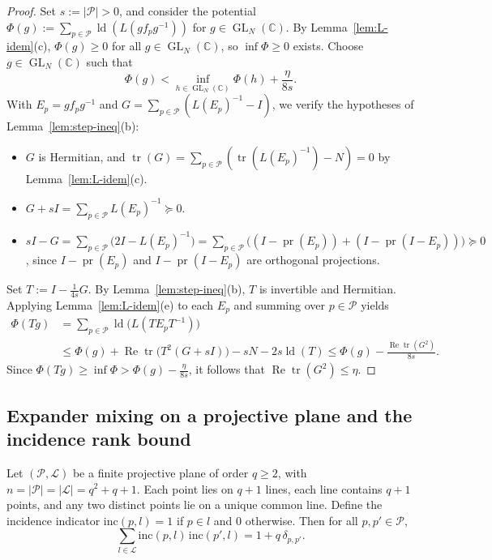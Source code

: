 \documentclass[11pt]{article}
\theoremstyle{definition}
\theoremstyle{remark}
\numberwithin{equation}{section}
\DeclareMathOperator{\tr}{tr}
\DeclareMathOperator{\ld}{ld}
\DeclareMathOperator{\pr}{pr}
\DeclareMathOperator{\GL}{GL}
\DeclareMathOperator{\RePart}{Re}
\newcommand{\C}{\mathbb{C}}
\newcommand{\PP}{\mathcal{P}}
\newcommand{\LL}{\mathcal{L}}
\newcommand{\1}{\mathbf{1}}
\begin{document}
\begin{proof}
Set $s := |\PP| > 0$, and consider the potential $\Phi(g) := \sum_{p \in \PP} \ld(L(g f_p g^{-1}))$ for $g \in \GL_N(\C)$. By Lemma~\ref{lem:L-idem}(c), $\Phi(g) \ge 0$ for all $g \in \GL_N(\C)$, so $\inf \Phi \ge 0$ exists. Choose $g \in \GL_N(\C)$ such that
\[
\Phi(g) < \inf_{h \in \GL_N(\C)} \Phi(h) + \frac{\eta}{8s}.
\]
With $E_p = g f_p g^{-1}$ and $G = \sum_{p \in \PP}(L(E_p)^{-1} - I)$, we verify the hypotheses of Lemma~\ref{lem:step-ineq}(b):
\begin{itemize}[leftmargin=1.8em]
\item $G$ is Hermitian, and $\tr(G) = \sum_{p \in \PP}(\tr(L(E_p)^{-1}) - N) = 0$ by Lemma~\ref{lem:L-idem}(c).
\item $G + sI = \sum_{p \in \PP} L(E_p)^{-1} \succeq 0$.
\item $sI - G = \sum_{p \in \PP}\bigl(2I - L(E_p)^{-1}\bigr) = \sum_{p \in \PP}\bigl((I - \pr(E_p)) + (I - \pr(I - E_p))\bigr) \succeq 0$, since $I - \pr(E_p)$ and $I - \pr(I - E_p)$ are orthogonal projections.
\end{itemize}
Set $T := I - \frac{1}{4s}G$. By Lemma~\ref{lem:step-ineq}(b), $T$ is invertible and Hermitian. Applying Lemma~\ref{lem:L-idem}(e) to each $E_p$ and summing over $p \in \PP$ yields
\begin{align*}
\Phi(Tg)
&= \sum_{p \in \PP} \ld\bigl(L(T E_p T^{-1})\bigr) \\
&\le \Phi(g) + \RePart\tr\bigl(T^2 (G + sI)\bigr) - sN - 2s\ld(T)
\le \Phi(g) - \frac{\RePart\tr(G^2)}{8s}.
\end{align*}
Since $\Phi(Tg) \ge \inf \Phi > \Phi(g) - \frac{\eta}{8s}$, it follows that $\RePart\tr(G^2) \le \eta$.
\end{proof}

\subsection{Expander mixing on a projective plane and the incidence rank bound}

Let $(\PP, \LL)$ be a finite projective plane of order $q \ge 2$, with $n = |\PP| = |\LL| = q^2 + q + 1$. Each point lies on $q+1$ lines, each line contains $q+1$ points, and any two distinct points lie on a unique common line. Define the incidence indicator $\mathrm{inc}(p, l) = 1$ if $p \in l$ and $0$ otherwise. Then for all $p, p' \in \PP$,
\begin{equation}
\label{eq:inc-orth}
\sum_{l \in \LL} \mathrm{inc}(p, l)\,\mathrm{inc}(p', l) = 1 + q\,\delta_{p, p'}.
\end{equation}
\end{document}
